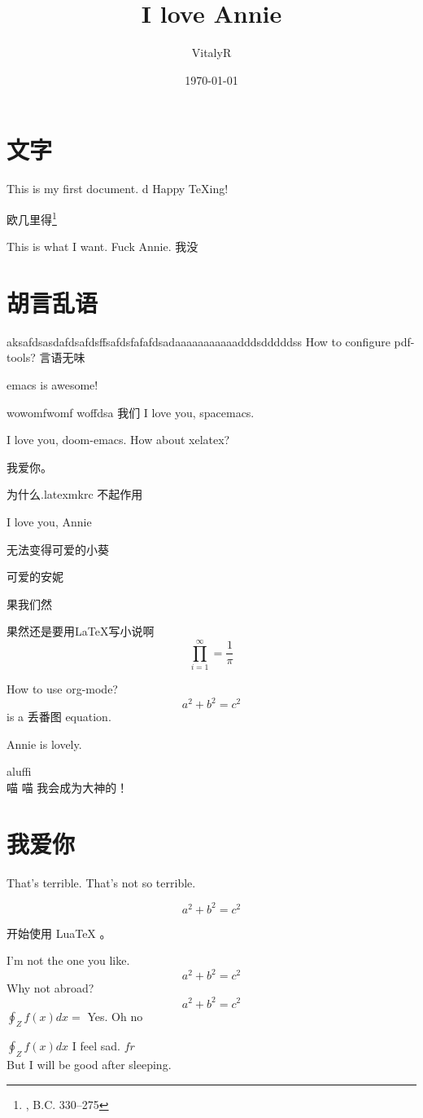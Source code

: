 \message{ !name(try_latex.tex)}\documentclass[UTF8]{ctexart}
\title{I love Annie}
\author{VitalyR}
\date{\today}
\begin{document}

\maketitle
\tableofcontents

\section{文字}
This is my first document.
d
Happy \TeX ing!

欧几里得\footnote{, B.C. 330--275}

This is what I want.
Fuck Annie.
我没

\section{胡言乱语}

aksafdsasdafdsafdsffsafdsfafafdsadaaaaaaaaaaadddsdddddss
How to configure pdf-tools?
言语无味

emacs is awesome!

wowomfwomf woffdsa
我们
I love you, spacemacs.

I love you, doom-emacs.
How about xelatex?

我爱你。

为什么.latexmkrc 不起作用

I love you, Annie

无法变得可爱的小葵

可爱的安妮

果我们然

果然还是要用\LaTeX 写小说啊
\begin{equation}
	\prod_{i=1}^{\infty}=\frac{1}{\pi}
\end{equation}

How to use org-mode?
\[a^{2}+b^{2}=c^{2}\] is a 丢番图 equation.

Annie is lovely.

aluffi \\
喵
喵
我会成为大神的！

\section{我爱你}

That's terrible.
That's not so terrible.



\begin{equation}
	\label{eq:2}
	a^{2}+b^{2}=c^{2}
\end{equation}

开始使用 LuaTeX 。

I'm not the one you like.
\[a^{2}+b^{2}=c^{2}\]
Why not abroad?
\[a^{2}+b^{2}=c^{2}\] \(\oint_{Z}f(x)dx = \) Yes.
Oh
no

\(\oint_{Z}f(x)dx\)
I feel sad.
\(fr\)
\[\]
But I will be good after sleeping.
\end{document}

